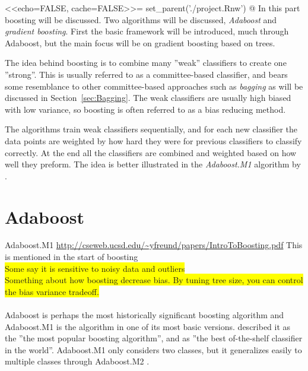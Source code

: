 <<echo=FALSE, cache=FALSE>>=
set_parent('./project.Rnw')
@
In this part boosting will be discussed. Two algorithms will be discussed, \textit{Adaboost} and \textit{gradient boosting}. First the basic framework will be introduced, much through Adaboost, but the main focus will be on gradient boosting based on trees. 

The idea behind boosting is to combine many ''weak'' classifiers to create one ''strong''. This is usually referred to as a committee-based classifier, and bears some resemblance to other committee-based approaches such as \textit{bagging} as will be discussed in Section~\ref{sec:Bagging}. The weak classifiers are usually high biased with low variance, so boosting is often referred to as a bias reducing method. 

The algorithms train weak classifiers sequentially, and for each new classifier the data points are weighted by how hard they were for previous classifiers to classify correctly. At the end all the classifiers are combined and weighted based on how well they preform. The idea is better illustrated in the \textit{Adaboost.M1} algorithm by  \cite{adaboostM1}.
\section{Adaboost}
\label{sec:Adaboost}
Adaboost.M1 \url{http://cseweb.ucsd.edu/~yfreund/papers/IntroToBoosting.pdf} This is mentioned in the start of boosting \cite{modstat} \\
\colorbox{yellow}{Some say it is sensitive to noisy data and outliers}\\
\colorbox{yellow}{Something about how boosting decrease bias. By tuning tree size, you can control the bias variance tradeoff.}\\
\\
Adaboost is perhaps the most historically significant boosting algorithm and Adaboost.M1 is the algorithm in one of its most basic versions. \cite{modstat} described it as the ''the most popular boosting algorithm'', and \cite{Breiman1996} as ''the best of-the-shelf classifier in the world''. Adaboost.M1 only considers two classes, but it generalizes easily to multiple classes through Adaboost.M2 \cite{adaboostM1}. 

